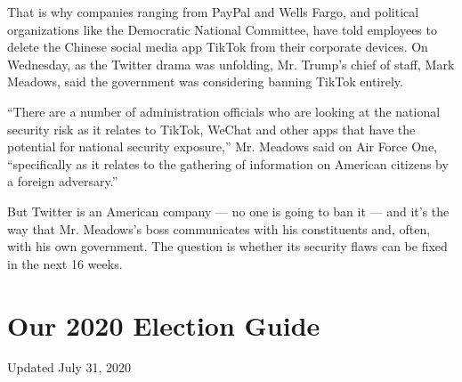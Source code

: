 That is why companies ranging from PayPal and Wells Fargo, and political
organizations like the Democratic National Committee, have told
employees to delete the Chinese social media app TikTok from their
corporate devices. On Wednesday, as the Twitter drama was unfolding, Mr.
Trump's chief of staff, Mark Meadows, said the government was
considering banning TikTok entirely.

``There are a number of administration officials who are looking at the
national security risk as it relates to TikTok, WeChat and other apps
that have the potential for national security exposure,'' Mr. Meadows
said on Air Force One, ``specifically as it relates to the gathering of
information on American citizens by a foreign adversary.''

But Twitter is an American company --- no one is going to ban it --- and
it's the way that Mr. Meadows's boss communicates with his constituents
and, often, with his own government. The question is whether its
security flaws can be fixed in the next 16 weeks.

\hypertarget{our-2020-election-guide}{%
\section{Our 2020 Election Guide}\label{our-2020-election-guide}}

Updated July 31, 2020

